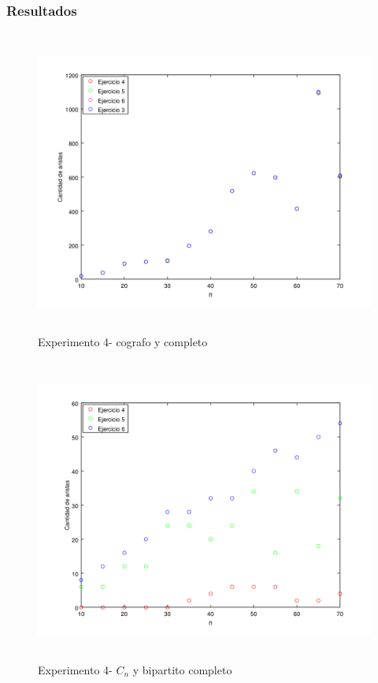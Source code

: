 \subsubsection*{Resultados}\;
  \begin{figure}[H]
      \includegraphics[height=10cm]{graficos/ejercicio7-exp4-comb1.png}
       \caption{Experimento 4- cografo y completo}
	\end{figure}
    
      \begin{figure}[H]
      \includegraphics[height=10cm]{graficos/ejercicio7-exp4-comb2.png}
       \caption{Experimento 4- $C_n$ y bipartito completo}
	\end{figure}
    
